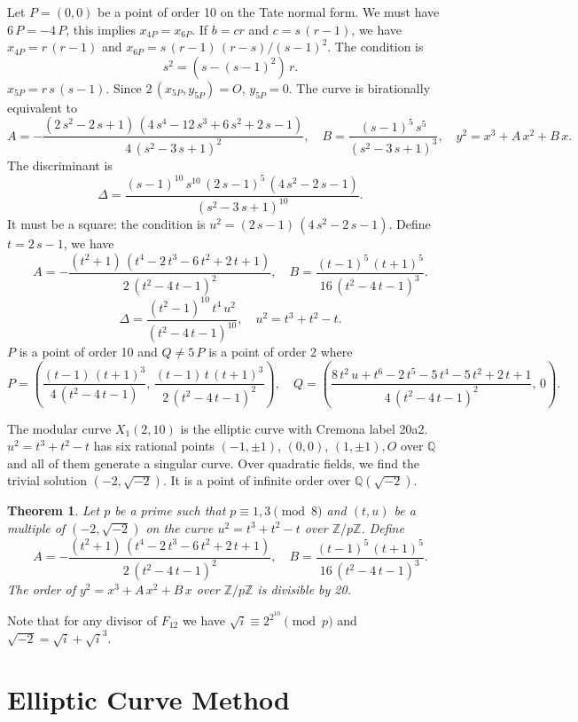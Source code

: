 \documentclass[a4paper, 11pt, pdftex]{report}
\theoremstyle{plain}
\newtheorem{theorem}{Theorem}[chapter]
\theoremstyle{definition}
\begin{document}
Let $P = (0, 0)$ be a point of order 10 on the Tate normal form. We must have $6\,P = -4\,P$,
this implies $x_{4P} = x_{6P}$. If $b = cr$ and $c = s\,(r - 1)$,
we have $x_{4P} = r\,(r - 1)$ and $x_{6P} = s\,(r - 1)\,(r - s) / (s - 1)^2$.
The condition is
$$s^2 = (s - (s - 1)^2)\,r.$$
$x_{5P} = r\,s\,(s - 1)$. Since $2\,(x_{5P}, y_{5P}) = O$, $y_{5P} = 0$. The curve is 
birationally equivalent to
$$A = -\frac{(2\,s^2 - 2\,s + 1)\,(4\,s^4 - 12\,s^3 + 6\,s^2 + 2\,s - 1)}{4\,(s^2 - 3\,s + 1)^2},\quad
B = \frac{(s - 1)^5\, s^5}{(s^2 - 3\,s + 1)^3},\quad y^2 = x^3 + A\,x^2 + B\,x.$$
The discriminant is
$$\Delta = \frac{(s-1)^{10}\,s^{10}\,(2\,s - 1)^5\,(4\,s^2 - 2\,s - 1)}{(s^2 - 3\,s + 1)^{10}}.$$
It must be a square: the condition is $u^2 = (2\,s - 1)\,(4\,s^2 - 2\,s - 1)$.
Define $t = 2\,s - 1$, we have
$$A = -\frac{(t^2 + 1)\,(t^4 - 2\,t^3 - 6 \,t^2 + 2\,t + 1)}{2\,(t^2 - 4\,t - 1)^2},\quad
B = \frac{(t - 1)^5\,(t + 1)^5}{16\,(t^2 - 4\,t - 1)^3}.$$
$$\Delta = \frac{(t^2 - 1)^{10}\,t^4\,u^2}{(t^2 - 4\,t - 1)^{10}},\quad
u^2 = t^3 + t^2 - t.$$
$P$ is a point of order 10 and $Q \neq 5\,P$ is a point of order 2 where
$$P = \left(\frac{(t - 1)\,(t + 1)^3}{4\,(t^2 - 4\,t - 1)},\,
            \frac{(t - 1)\,t\,(t + 1)^3}{2\,(t^2 - 4\,t - 1)^2}\right),\quad
  Q = \left(\frac{8\,t^2\,u + t^6 - 2\,t^5 - 5\,t^4 - 5\,t^2 + 2\,t + 1}
                 {4\,(t^2 - 4\,t - 1)^2},\, 0\right).$$

The modular curve $X_1(2, 10)$ is the elliptic curve with Cremona label 20a2.
$u^2 = t^3 + t^2 - t$ has six rational points $(-1, \pm1)$, $(0, 0)$, $(1, \pm1), O$
over $\mathbb{Q}$ and all of them generate a singular curve.
Over quadratic fields, we find the trivial solution $(-2, \sqrt{-2})$. It is a point of
infinite order over $\mathbb{Q}(\sqrt{-2})$.

\begin{theorem} \label{Th_2x10}
Let $p$ be a prime such that $p \equiv 1, 3 \pmod{8}$ and $(t, u)$ be a multiple
of $(-2, \sqrt{-2})$ on the curve $u^2 = t^3 + t^2 - t$ over $\mathbb{Z}/p\mathbb{Z}$.
Define
$$A = -\frac{(t^2 + 1)\,(t^4 - 2\,t^3 - 6 \,t^2 + 2\,t + 1)}{2\,(t^2 - 4\,t - 1)^2},\quad
B = \frac{(t - 1)^5\,(t + 1)^5}{16\,(t^2 - 4\,t - 1)^3}.$$
The order of $y^2 = x^3 + A\,x^2 + B\,x$ over $\mathbb{Z}/p\mathbb{Z}$ is divisible by 20.
\end{theorem}
Note that for any divisor of $F_{12}$ we have $\sqrt{i} \equiv 2^{2^{10}} \pmod{p}$ and
$\sqrt{-2} = \sqrt{i} + \sqrt{i}^3$.

\chapter{Elliptic Curve Method}
\end{document}
